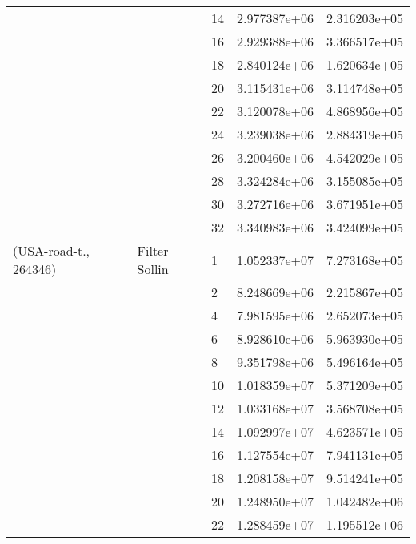 \begin{tabular}{lllrr}
                      &                     & 14 &  2.977387e+06 &  2.316203e+05 \\
                      &                     & 16 &  2.929388e+06 &  3.366517e+05 \\
                      &                     & 18 &  2.840124e+06 &  1.620634e+05 \\
                      &                     & 20 &  3.115431e+06 &  3.114748e+05 \\
                      &                     & 22 &  3.120078e+06 &  4.868956e+05 \\
                      &                     & 24 &  3.239038e+06 &  2.884319e+05 \\
                      &                     & 26 &  3.200460e+06 &  4.542029e+05 \\
                      &                     & 28 &  3.324284e+06 &  3.155085e+05 \\
                      &                     & 30 &  3.272716e+06 &  3.671951e+05 \\
                      &                     & 32 &  3.340983e+06 &  3.424099e+05 \\
(USA-road-t., 264346) & Filter Sollin & 1  &  1.052337e+07 &  7.273168e+05 \\
                      &                     & 2  &  8.248669e+06 &  2.215867e+05 \\
                      &                     & 4  &  7.981595e+06 &  2.652073e+05 \\
                      &                     & 6  &  8.928610e+06 &  5.963930e+05 \\
                      &                     & 8  &  9.351798e+06 &  5.496164e+05 \\
                      &                     & 10 &  1.018359e+07 &  5.371209e+05 \\
                      &                     & 12 &  1.033168e+07 &  3.568708e+05 \\
                      &                     & 14 &  1.092997e+07 &  4.623571e+05 \\
                      &                     & 16 &  1.127554e+07 &  7.941131e+05 \\
                      &                     & 18 &  1.208158e+07 &  9.514241e+05 \\
                      &                     & 20 &  1.248950e+07 &  1.042482e+06 \\
                      &                     & 22 &  1.288459e+07 &  1.195512e+06 \\

\end{tabular}
